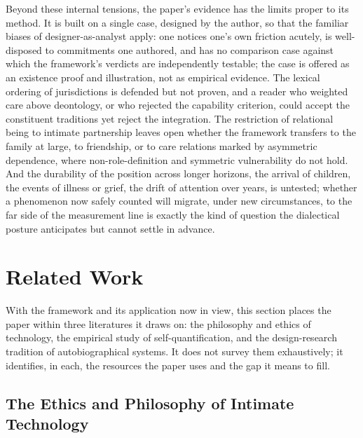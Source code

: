 \documentclass[11pt,a4paper]{article}
\begin{document}
Beyond these internal tensions, the paper's evidence has the limits proper to its method. It is built on a single case, designed by the author, so that the familiar biases of designer-as-analyst apply: one notices one's own friction acutely, is well-disposed to commitments one authored, and has no comparison case against which the framework's verdicts are independently testable; the case is offered as an existence proof and illustration, not as empirical evidence. The lexical ordering of jurisdictions is defended but not proven, and a reader who weighted care above deontology, or who rejected the capability criterion, could accept the constituent traditions yet reject the integration. The restriction of relational being to intimate partnership leaves open whether the framework transfers to the family at large, to friendship, or to care relations marked by asymmetric dependence, where non-role-definition and symmetric vulnerability do not hold. And the durability of the position across longer horizons, the arrival of children, the events of illness or grief, the drift of attention over years, is untested; whether a phenomenon now safely counted will migrate, under new circumstances, to the far side of the measurement line is exactly the kind of question the dialectical posture anticipates but cannot settle in advance.

\section{Related Work}\label{p01:sec:related}

With the framework and its application now in view, this section places the paper within three literatures it draws on: the philosophy and ethics of technology, the empirical study of self-quantification, and the design-research tradition of autobiographical systems. It does not survey them exhaustively; it identifies, in each, the resources the paper uses and the gap it means to fill.

\subsection{The Ethics and Philosophy of Intimate Technology}
\end{document}
